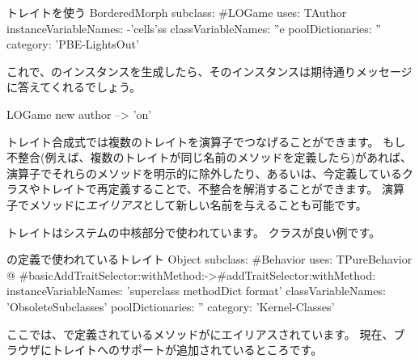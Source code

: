 \documentclass[a4paper,10pt,twoside]{book}
\begin{document}
\begin{classdef}[sbegamewithtrait]{トレイトを使う}
BorderedMorph subclass: #LOGame
	uses: TAuthor
	instanceVariableNames: -'cells'ss
	classVariableNames: ''e
	poolDictionaries: ''
	category: 'PBE-LightsOut'
\end{classdef}

これで、のインスタンスを生成したら、そのインスタンスは期待通りメッセージに答えてくれるでしょう。

\begin{code}{}
LOGame new author --> 'on'
\end{code}

トレイト合成式では複数のトレイトを\ct{+}演算子でつなげることができます。
もし不整合(例えば、複数のトレイトが同じ名前のメソッドを定義したら)があれば、\ct{-}演算子でそれらのメソッドを明示的に除外したり、あるいは、今定義しているクラスやトレイトで再定義することで、不整合を解消することができます。
演算子でメソッドに\emph{エイリアス}として新しい名前を与えることも可能です。

トレイトはシステムの中核部分で使われています。
\mbox{}クラスが良い例です。

\begin{classdef}[behaviorwithtraits]{の定義で使われているトレイト}
Object subclass: #Behavior
	uses: TPureBehavior @ {#basicAddTraitSelector:withMethod:->#addTraitSelector:withMethod:}
	instanceVariableNames: 'superclass methodDict format'
	classVariableNames: 'ObsoleteSubclasses'
	poolDictionaries: ''
	category: 'Kernel-Classes'
\end{classdef}
\noindent
ここでは、で定義されているメソッドがにエイリアスされています。
現在、ブラウザにトレイトへのサポートが追加されているところです。
\end{document}
